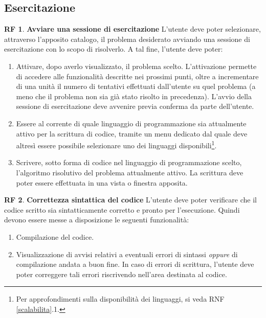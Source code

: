 \documentclass[11pt, a4paper]{article}
\theoremstyle{definition}
\newtheorem{funcreq}{RF} %
\begin{document}
\subsection{Esercitazione}
\begin{funcreq}
\label{exesession}
\textbf{Avviare una sessione di esercitazione }
L'utente deve poter selezionare, attraverso l'apposito catalogo, il
problema desiderato avviando una sessione di esercitazione con lo scopo
di risolverlo. A tal fine, l'utente deve poter:
\begin{enumerate}
    \item Attivare, dopo averlo visualizzato, il problema scelto. L'attivazione permette di accedere alle funzionalità descritte nei prossimi punti, oltre a incrementare di una unità il numero di tentativi
    effettuati dall'utente su quel problema (a meno che il problema non
    sia già stato risolto in precedenza). L'avvio della sessione di
    esercitazione deve avvenire previa conferma da parte dell'utente.
    
    \item Essere al corrente di quale linguaggio di programmazione sia
    attualmente attivo per la scrittura di codice, tramite un menu dedicato
    dal quale deve altresì essere possibile selezionare uno dei linguaggi
    disponibili\footnote{Per approfondimenti sulla disponibilità dei linguaggi, si veda RNF \ref{scalabilita}.1.}.
    
    \item Scrivere, sotto forma di codice nel linguaggio di programmazione
    scelto, l'algoritmo risolutivo del problema attualmente attivo. La
    scrittura deve poter essere effettuata in una vista o finestra apposita.
\end{enumerate}
\end{funcreq}

\begin{funcreq}
\label{sintax}
\textbf{Correttezza sintattica del codice }
L'utente deve poter verificare che il codice scritto sia sintatticamente
corretto e pronto per l'esecuzione. Quindi devono essere messe a disposizione
le seguenti funzionalità:
\begin{enumerate}
    \item Compilazione del codice.
    \item Visualizzazione di avvisi relativi a eventuali errori di sintassi
    \textit{oppure} di compilazione andata a buon fine. In caso di errori
    di scrittura, l'utente deve poter correggere tali errori riscrivendo
    nell'area destinata al codice.
\end{enumerate}
\end{funcreq}
\end{document}
